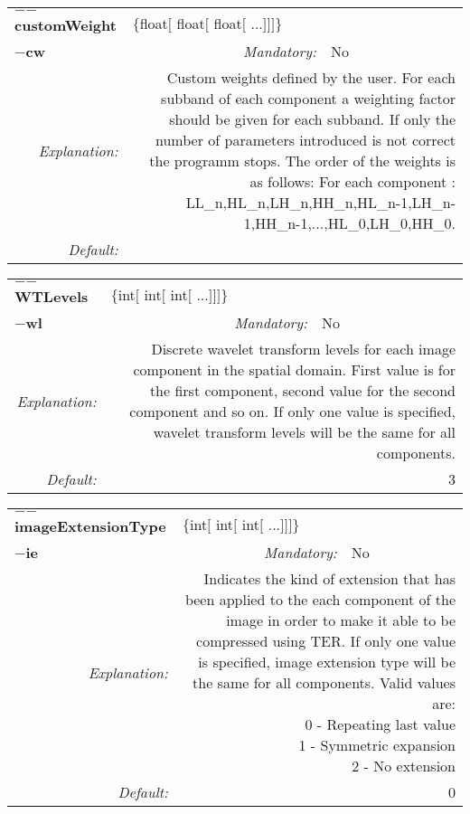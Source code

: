 \begin{center}\begin{tabular}{|rr|rlrl|}
\hline
\multicolumn{2}{|l|}{\textbf{$-$$-$customWeight}} & \multicolumn{4}{|l|}{$\{$float$[$ float$[$ float$[$ ...$]$$]$$]$$\}$} \\
\cline{3-6}
\multicolumn{2}{|l|}{\textbf{$-$cw}} & \emph{Mandatory:} & No & &  \\
\hline
\emph{Explanation:} & \multicolumn{5}{|p{12cm}|}{Custom weights defined by the user. For each subband of each component a weighting factor should be given for each subband. If only the number of parameters introduced is not correct the programm stops. The order of the weights is as follows: For each component :\newline LL\_n,HL\_n,LH\_n,HH\_n,HL\_n-1,LH\_n-1,HH\_n-1,...,HL\_0,LH\_0,HH\_0.} \\
\hline
\emph{Default:} & \multicolumn{5}{|p{12cm}|}{} \\
\hline
\end{tabular}\end{center}
\begin{center}\begin{tabular}{|rr|rlrl|}
\hline
\multicolumn{2}{|l|}{\textbf{$-$$-$WTLevels}} & \multicolumn{4}{|l|}{$\{$int$[$ int$[$ int$[$ ...$]$$]$$]$$\}$} \\
\cline{3-6}
\multicolumn{2}{|l|}{\textbf{$-$wl}} & \emph{Mandatory:} & No & &  \\
\hline
\emph{Explanation:} & \multicolumn{5}{|p{12cm}|}{Discrete wavelet transform levels for each image component in the spatial domain. First value is for the first component, second value for the second component and so on. If only one value is specified, wavelet transform levels will be the same for all components.} \\
\hline
\emph{Default:} & \multicolumn{5}{|p{12cm}|}{3 } \\
\hline
\end{tabular}\end{center}
\begin{center}\begin{tabular}{|rr|rlrl|}
\hline
\multicolumn{2}{|l|}{\textbf{$-$$-$imageExtensionType}} & \multicolumn{4}{|l|}{$\{$int$[$ int$[$ int$[$ ...$]$$]$$]$$\}$} \\
\cline{3-6}
\multicolumn{2}{|l|}{\textbf{$-$ie}} & \emph{Mandatory:} & No & &  \\
\hline
\emph{Explanation:} & \multicolumn{5}{|p{12cm}|}{Indicates the kind of extension that has been applied to the each component of the image in order to make it able to be compressed using TER.  If only one value is specified, image extension type will be the same for all components. Valid values are:\newline 0 - Repeating last value\newline 1 - Symmetric expansion\newline 2 - No extension} \\
\hline
\emph{Default:} & \multicolumn{5}{|p{12cm}|}{0 } \\
\hline
\end{tabular}\end{center}

